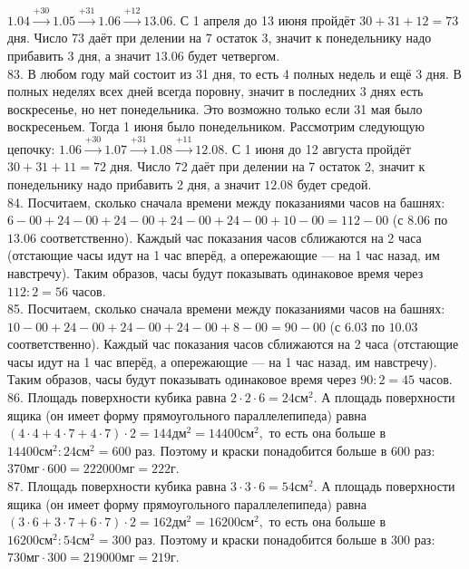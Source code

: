 \documentclass[12pt]{article}
\begin{document}
$1.04\stackrel{+30}{\rightarrow}1.05\stackrel{+31}{\rightarrow}1.06\stackrel{+12}{\rightarrow}13.06.$ С 1 апреля до 13 июня пройдёт $30+31+12=73$ дня. Число 73 даёт при делении на 7 остаток 3, значит к понедельнику надо прибавить 3 дня, а значит $13.06$ будет четвергом.\\
83. В любом году май состоит из 31 дня, то есть 4 полных недель и ещё 3 дня. В полных неделях всех дней всегда поровну, значит в последних 3 днях есть воскресенье, но нет понедельника. Это возможно только если 31 мая было воскресеньем. Тогда 1 июня было понедельником. Рассмотрим следующую цепочку:
$1.06\stackrel{+30}{\rightarrow}1.07\stackrel{+31}{\rightarrow}1.08\stackrel{+11}{\rightarrow}12.08.$ С 1 июня до 12 августа пройдёт $30+31+11=72$ дня. Число 72 даёт при делении на 7 остаток 2, значит к понедельнику надо прибавить 2 дня, а значит $12.08$ будет средой.\\
84. Посчитаем, сколько сначала времени между показаниями часов на башнях: $6-00+24-00+24-00+24-00+24-00+10-00=112-00$ (с $8.06$ по $13.06$ соответственно). Каждый час показания часов сближаются на 2 часа (отстающие часы идут на 1 час вперёд, а опережающие --- на 1 час назад, им навстречу). Таким образов, часы будут показывать одинаковое время через $112:2=56$ часов.\\
85. Посчитаем, сколько сначала времени между показаниями часов на башнях: $10-00+24-00+24-00+24-00+8-00=90-00$ (с $6.03$ по $10.03$ соответственно). Каждый час показания часов сближаются на 2 часа (отстающие часы идут на 1 час вперёд, а опережающие --- на 1 час назад, им навстречу). Таким образов, часы будут показывать одинаковое время через $90:2=45$ часов.\\
86. Площадь поверхности кубика равна $2\cdot2\cdot6=24\text{см}^2.$ А площадь поверхности ящика (он имеет форму прямоугольного параллелепипеда) равна $(4\cdot4+4\cdot7+4\cdot7)\cdot2=144\text{дм}^2=14400\text{см}^2,$ то есть она больше в $14400\text{см}^2:24\text{см}^2=600$ раз. Поэтому и краски понадобится больше в 600 раз: $370\text{мг}\cdot600=222000\text{мг}=222$г.\\
87. Площадь поверхности кубика равна $3\cdot3\cdot6=54\text{см}^2.$ А площадь поверхности ящика (он имеет форму прямоугольного параллелепипеда) равна $(3\cdot6+3\cdot7+6\cdot7)\cdot2=162\text{дм}^2=16200\text{см}^2,$ то есть она больше в $16200\text{см}^2:54\text{см}^2=300$ раз. Поэтому и краски понадобится больше в 300 раз: $730\text{мг}\cdot300=219000\text{мг}=219$г.\\
\end{document}
